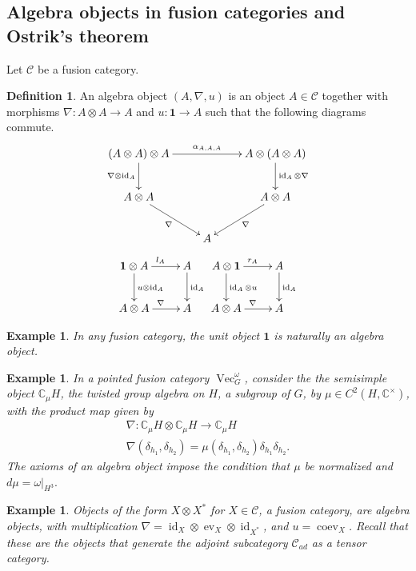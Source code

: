 \documentclass[a4paper, 10pt]{book}
\newtheorem{Expl}[theorem]{Example}
\theoremstyle{definition}
\newtheorem{Def}[theorem]{Definition}
\numberwithin{equation}{chapter}
\newcommand\id{\operatorname{id}}
\newcommand\ot{\otimes}
\newcommand\Vect{\operatorname{Vec}}
\newcommand\CC{\mathbb C}
\newcommand\C{\mathcal C}
\newcommand{\ra}\rightarrow
\newcommand\one{\mathbf{1}}
\newcommand\ev{\operatorname{ev}}
\newcommand\coev{\operatorname{coev}}
\begin{document}
\subsection{Algebra objects in fusion categories and Ostrik's theorem}
Let $\C$ be a fusion category.
\begin{Def}\label{algdef}
 An algebra object $(A, \nabla, u)$ is an object $A\in \C$ together with morphisms $\nabla:A\otimes A \rightarrow A$  and $u: \one\rightarrow A$ such that the following diagrams commute.
\[
\xymatrix{(A \otimes A) \otimes A \ar[d]_{\nabla \otimes \id_A} \ar[rr]^{\alpha_{A, A, A}}& & A\ot (A\ot A)\ar[d]^{\id_A\otimes \nabla}\\
A\otimes A \ar[rd]_{\nabla} & & A\otimes A\ar[ld]^{\nabla}\\
& A & }
\]
\[
\xymatrix{ \one \ot A\ar[d]^{u\ot \id_A} \ar[r]^{l_A} & A\ar[d]^{\id_A} \\
A\ot A \ar[r]^{\nabla} & A
}
\xymatrix{  A\ot \one \ar[d]^{ \id_A\ot u} \ar[r]^{r_A} & A\ar[d]^{\id_A} \\
A\ot A \ar[r]^{\nabla} & A
}
\]
\end{Def}

\begin{Expl}\rm
In any fusion category, the unit object $\one$ is naturally an algebra object.
\end{Expl}

\begin{Expl}\rm
In a pointed fusion category $\Vect^\omega_G$, consider the the semisimple object $\CC_\mu H$, the twisted group algebra on $H$, a subgroup of $G$, by $\mu \in C^2(H, \CC^\times)$, with the product map given by \begin{align*}
	\nabla:\CC_\mu H \ot \CC_\mu H \ra \CC_\mu H\\
	\nabla(\delta_{h_1}, \delta_{h_2}) = \mu(\delta_{h_1}, \delta_{h_2})\delta_{h_1}\delta_{h_2}.
\end{align*} The axioms of an algebra object impose the condition that $\mu$ be normalized and $d\mu=\omega|_{H^3}.$
\end{Expl}
\begin{Expl}\rm\label{canonicalalg}
Objects of the form $X\otimes X^*$ for $X\in \C$, a fusion category, are algebra objects, with multiplication $\nabla = \id_X \otimes \ev_X \otimes \id_{X^*}$, and $u = \coev_X$. Recall that these are the objects that generate the adjoint subcategory $\C_{ad}$ as a tensor category.
\end{Expl}
\end{document}
